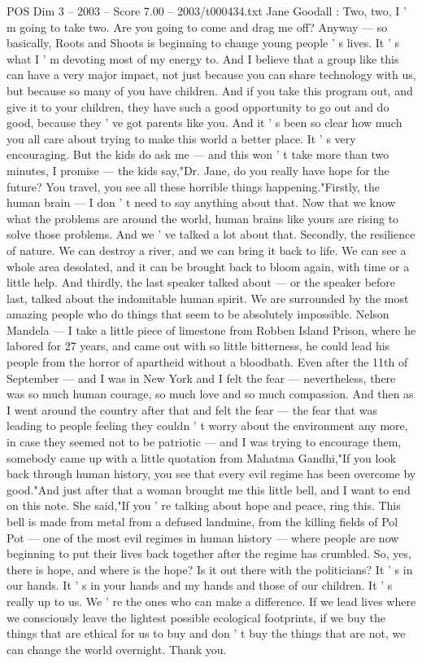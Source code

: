 \begin{textsample}{POS Dim 3 – 2003 – Score 7.00 – 2003/t000434.txt}
Jane Goodall : Two, two, I ' m going to take two.
Are you going to come and drag me off?
Anyway — so basically, Roots and Shoots is beginning to change young people ' s lives.
It ' s what I ' m devoting most of my energy to.
And I believe that a group like this can have a very major impact, not just because you can share technology with us, but because so many of you have children.
And if you take this program out, and give it to your children, they have such a good opportunity to go out and do good, because they ' ve got parents like you.
And it ' s been so clear how much you all care about trying to make this world a better place.
It ' s very encouraging.
But the kids do ask me — and this won ' t take more than two minutes, I promise — the kids say,"Dr.
Jane, do you really have hope for the future?
You travel, you see all these horrible things happening."Firstly, the human brain — I don ' t need to say anything about that.
Now that we know what the problems are around the world, human brains like yours are rising to solve those problems.
And we ' ve talked a lot about that.
Secondly, the resilience of nature.
We can destroy a river, and we can bring it back to life.
We can see a whole area desolated, and it can be brought back to bloom again, with time or a little help.
And thirdly, the last speaker talked about — or the speaker before last, talked about the indomitable human spirit.
We are surrounded by the most amazing people who do things that seem to be absolutely impossible.
Nelson Mandela — I take a little piece of limestone from Robben Island Prison, where he labored for 27 years, and came out with so little bitterness, he could lead his people from the horror of apartheid without a bloodbath.
Even after the 11th of September — and I was in New York and I felt the fear — nevertheless, there was so much human courage, so much love and so much compassion.
And then as I went around the country after that and felt the fear — the fear that was leading to people feeling they couldn ' t worry about the environment any more, in case they seemed not to be patriotic — and I was trying to encourage them, somebody came up with a little quotation from Mahatma Gandhi,"If you look back through human history, you see that every evil regime has been overcome by good."And just after that a woman brought me this little bell, and I want to end on this note.
She said,"If you ' re talking about hope and peace, ring this.
This bell is made from metal from a defused landmine, from the killing fields of Pol Pot — one of the most evil regimes in human history — where people are now beginning to put their lives back together after the regime has crumbled.
So, yes, there is hope, and where is the hope?
Is it out there with the politicians?
It ' s in our hands.
It ' s in your hands and my hands and those of our children.
It ' s really up to us.
We ' re the ones who can make a difference.
If we lead lives where we consciously leave the lightest possible ecological footprints, if we buy the things that are ethical for us to buy and don ' t buy the things that are not, we can change the world overnight.
Thank you.

\end{textsample}
